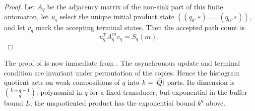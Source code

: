 \begin{proof}
Let \(A_q\) be the adjacency matrix of the non-sink part of this finite
automaton, let \(u_q\) select the unique initial product state
\(((q_0,\varepsilon),\dots,(q_0,\varepsilon))\), and let \(v_q\) mark the
accepting terminal states.  Then the accepted path count is
\[
  u_q^{\mathsf T}A_q^m v_q=S_q(m).
\]
\end{proof}

The proof of  is now immediate from
.  The asynchronous update and terminal
condition are invariant under permutation of the copies.  Hence the histogram
quotient acts on weak compositions of \(q\) into \(k=\lvert \widehat Q \rvert\)
parts.  Its dimension is \(\binom{k+q-1}{q}\): polynomial in \(q\) for a
fixed transducer, but exponential in the buffer bound \(L\); the unquotiented
product has the exponential bound \(k^q\) above.
